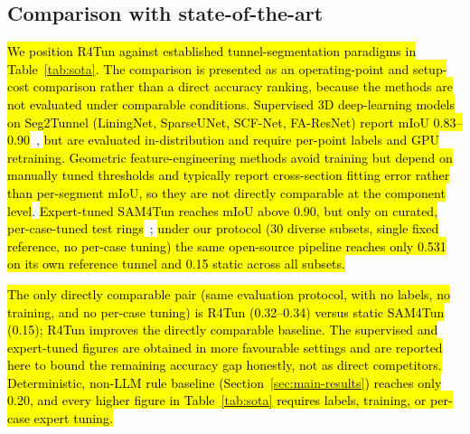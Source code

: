 \documentclass[a4paper,fleqn]{cas-dc}
\newcommand{\hlcite}[1]{\hl{\cite{#1}}}
\begin{document}
{%
\subsection{Comparison with state-of-the-art}\label{sec:positioning}

\hl{We position R4Tun against established tunnel-segmentation paradigms in Table~\ref{tab:sota}. The comparison is presented as an operating-point and setup-cost comparison rather than a direct accuracy ranking, because the methods are not evaluated under comparable conditions. Supervised 3D deep-learning models on Seg2Tunnel (LiningNet, SparseUNet, SCF-Net, FA-ResNet) report mIoU 0.83--0.90}~\hlcite{lin2024seg2tunnel}, \hl{but are evaluated in-distribution and require per-point labels and GPU retraining. Geometric feature-engineering methods avoid training but depend on manually tuned thresholds and typically report cross-section fitting error rather than per-segment mIoU, so they are not directly comparable at the component level}. \hl{Expert-tuned SAM4Tun reaches mIoU above 0.90, but only on curated, per-case-tuned test rings}~\hlcite{ye2025sam4tun}; \hl{under our protocol (30 diverse subsets, single fixed reference, no per-case tuning) the same open-source pipeline reaches only 0.531 on its own reference tunnel and 0.15 static across all subsets.}

\hl{The only directly comparable pair (same evaluation protocol, with no labels, no training, and no per-case tuning) is R4Tun (\mbox{0.32--0.34}) versus static SAM4Tun (0.15); R4Tun improves the directly comparable baseline. The supervised and expert-tuned figures are obtained in more favourable settings and are reported here to bound the remaining accuracy gap honestly, not as direct competitors. Deterministic, non-LLM rule baseline (Section~\ref{sec:main-results}) reaches only 0.20, and every higher figure in Table~\ref{tab:sota} requires labels, training, or per-case expert tuning.}

}
\end{document}
